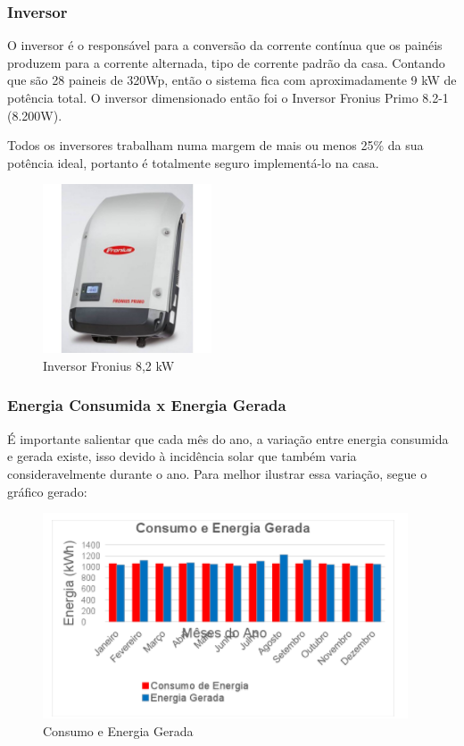 \subsubsection{Inversor}
\par O inversor é o responsável para a conversão da corrente contínua que os painéis produzem para a corrente alternada, tipo de corrente padrão da casa. Contando que são 28 paineis de 320Wp, então o sistema fica com aproximadamente 9 kW de potência total. O inversor dimensionado então foi o Inversor Fronius Primo 8.2-1 (8.200W).
\par Todos os inversores trabalham numa margem de mais ou menos 25\% da sua potência ideal, portanto é totalmente seguro implementá-lo na casa.

\begin{figure}[!h]
\centering
\caption{Inversor Fronius 8,2 kW}
\includegraphics[width=5cm]{figuras/inversor}
\end{figure}

\subsubsection{Energia Consumida x Energia Gerada}
\par É importante salientar que cada mês do ano, a variação entre energia consumida e gerada existe, isso devido à incidência solar que também varia consideravelmente durante o ano. Para melhor ilustrar essa variação, segue o gráfico gerado:

\begin{figure}[!h]
\centering
\caption{Consumo e Energia Gerada}
\includegraphics[width=\textwidth]{figuras/consumo_energia_gerada}
\end{figure}

